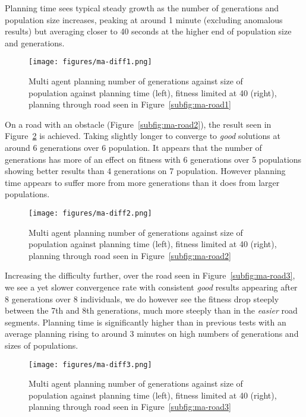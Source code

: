 Planning time sees typical steady growth as the number of generations and population size increases, peaking at around 1 minute (excluding anomalous results) but averaging closer to 40 seconds at the higher end of population size and generations.

\begin{figure}[ht]
  \centering
  \texttt{[image: figures/ma-diff1.png]}
  \caption{\label{fig:ma-diff1-lim40} Multi agent planning number of generations against size of population against planning time (left), fitness limited at 40 (right), planning through road seen in Figure~\ref{subfig:ma-road1}}
\end{figure}

On a road with an obstacle (Figure~\ref{subfig:ma-road2}), the result seen in Figure~\ref{fig:ma-diff2-lim40} is achieved. Taking slightly longer to converge to \textit{good} solutions at around 6 generations over 6 population. It appears that the number of generations has more of an effect on fitness with 6 generations over 5 populations showing better results than 4 generations on 7 population. However planning time appears to suffer more from more generations than it does from larger populations.

\begin{figure}[ht]
  \centering
  \texttt{[image: figures/ma-diff2.png]}
  \caption{\label{fig:ma-diff2-lim40} Multi agent planning number of generations against size of population against planning time (left), fitness limited at 40 (right), planning through road seen in Figure~\ref{subfig:ma-road2}}
\end{figure}


Increasing the difficulty further, over the road seen in Figure~\ref{subfig:ma-road3}, we see a yet slower convergence rate with consistent \textit{good} results appearing after 8 generations over 8 individuals, we do however see the fitness drop steeply between the 7th and 8th generations, much more steeply than in the \textit{easier} road segments. Planning time is significantly higher than in previous tests with an average planning rising to around 3 minutes on high numbers of generations and sizes of populations.

\begin{figure}[ht]
  \centering
  \texttt{[image: figures/ma-diff3.png]}
  \caption{\label{fig:ma-diff3-lim40} Multi agent planning number of generations against size of population against planning time (left), fitness limited at 40 (right), planning through road seen in Figure~\ref{subfig:ma-road3}}
\end{figure}

